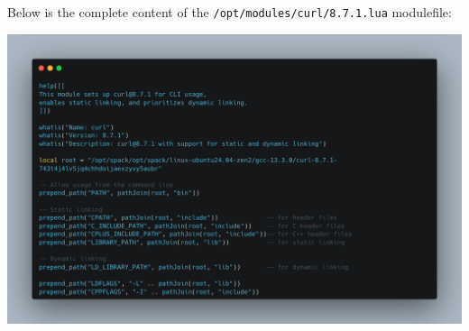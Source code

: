 \documentclass{article}
\begin{document}
Below is the complete content of the \texttt{/opt/modules/curl/8.7.1.lua} modulefile:

\begin{center}
    \includegraphics[width=1\textwidth]{./img/q4-2.png}
\end{center}







\end{document}
